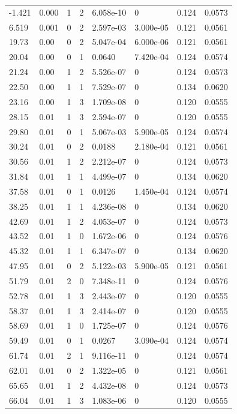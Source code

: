 \documentclass[preview]{standalone}
\begin{document}
{{\begin{tabular}{L{1.2cm}C{1.2cm} C{0.3cm}C{0.5cm} C{1.4cm}C{1.4cm} C{1.4cm}C{1.4cm}}
  -1.421  &  0.000  & 1     &  2 &  6.058e-10  & 0  & 0.124 &  0.0573   \\ 
  6.519  &  0.001  & 0     &  2 &  2.597e-03  & 3.000e-05  & 0.121 &  0.0561   \\ 
  19.73  &  0.00  & 0     &  2 &  5.047e-04  & 6.000e-06  & 0.121 &  0.0561   \\ 
  20.04  &  0.00  & 0     &  1 &  0.0640  & 7.420e-04  & 0.124 &  0.0574   \\ 
  21.24  &  0.00  & 1     &  2 &  5.526e-07  & 0  & 0.124 &  0.0573   \\ 
  22.50  &  0.00  & 1     &  1 &  7.529e-07  & 0  & 0.134 &  0.0620   \\ 
  23.16  &  0.00  & 1     &  3 &  1.709e-08  & 0  & 0.120 &  0.0555   \\ 
  28.15  &  0.01  & 1     &  3 &  2.594e-07  & 0  & 0.120 &  0.0555   \\ 
  29.80  &  0.01  & 0     &  1 &  5.067e-03  & 5.900e-05  & 0.124 &  0.0574   \\ 
  30.24  &  0.01  & 0     &  2 &  0.0188  & 2.180e-04  & 0.121 &  0.0561   \\ 
  30.56  &  0.01  & 1     &  2 &  2.212e-07  & 0  & 0.124 &  0.0573   \\ 
  31.84  &  0.01  & 1     &  1 &  4.499e-07  & 0  & 0.134 &  0.0620   \\ 
  37.58  &  0.01  & 0     &  1 &  0.0126  & 1.450e-04  & 0.124 &  0.0574   \\ 
  38.25  &  0.01  & 1     &  1 &  4.236e-08  & 0  & 0.134 &  0.0620   \\ 
  42.69  &  0.01  & 1     &  2 &  4.053e-07  & 0  & 0.124 &  0.0573   \\ 
  43.52  &  0.01  & 1     &  0 &  1.672e-06  & 0  & 0.124 &  0.0576   \\ 
  45.32  &  0.01  & 1     &  1 &  6.347e-07  & 0  & 0.134 &  0.0620   \\ 
  47.95  &  0.01  & 0     &  2 &  5.122e-03  & 5.900e-05  & 0.121 &  0.0561   \\ 
  51.79  &  0.01  & 2     &  0 &  7.348e-11  & 0  & 0.124 &  0.0576   \\ 
  52.78  &  0.01  & 1     &  3 &  2.443e-07  & 0  & 0.120 &  0.0555   \\ 
  58.37  &  0.01  & 1     &  3 &  2.414e-07  & 0  & 0.120 &  0.0555   \\ 
  58.69  &  0.01  & 1     &  0 &  1.725e-07  & 0  & 0.124 &  0.0576   \\ 
  59.49  &  0.01  & 0     &  1 &  0.0267  & 3.090e-04  & 0.124 &  0.0574   \\ 
  61.74  &  0.01  & 2     &  1 &  9.116e-11  & 0  & 0.124 &  0.0574   \\ 
  62.01  &  0.01  & 0     &  2 &  1.322e-05  & 0  & 0.121 &  0.0561   \\ 
  65.65  &  0.01  & 1     &  2 &  4.432e-08  & 0  & 0.124 &  0.0573   \\ 
  66.04  &  0.01  & 1     &  3 &  1.083e-06  & 0  & 0.120 &  0.0555   \\ 
\hline 
\end{tabular} 

}}
\end{document}
